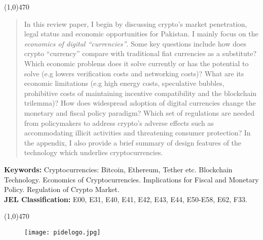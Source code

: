 \documentclass[12pt]{article}
\newcommand{\1}{\mathbbm 1}
\begin{document}
		\begin{center}
			\line(1,0){470}
		\end{center}
		\begin{spacing}{1.1}
			\vspace{-3ex}
			\begin{abstract}
				\noindent 
				In this review paper, I begin by discussing crypto's market penetration, legal status and economic opportunities for Pakistan. I mainly focus on the \textit{economics of digital ``currencies''}. Some key questions include how does crypto ``currency'' compare with traditional fiat currencies as a substitute? Which economic problems does it solve currently or has the potential to solve (e.g lowers verification costs and networking costs)? What are its economic limitations (e.g high energy costs, speculative bubbles, prohibitive costs of maintaining incentive compatibility and the blockchain trilemma)? How does widespread adoption of digital currencies change the monetary and fiscal policy paradigm? Which set of regulations are needed from policymakers to address crypto's adverse effects such as accommodating illicit activities and threatening consumer protection? In the appendix, I also provide a brief summary of design features of the technology which underlies cryptocurrencies.
			\end{abstract}
		\end{spacing}
		\textbf{Keywords:} Cryptocurrencies: Bitcoin, Ethereum, Tether etc. Blockchain Technology. Economics of Cryptocurrencies. Implications for Fiscal and Monetary Policy. Regulation of Crypto Market. {}\\
		\textbf{JEL Classification:} E00, E31, E40, E41, E42, E43, E44, E50-E58, E62, F33.
		\\
		\begin{center}
			\vspace{-8ex}
			\line(1,0){470}
		\end{center}
		\baselineskip=18pt 
		
		\newpage{}
		
		\begin{figure}[H]
			\begin{center}
				\texttt{[image: pidelogo.jpg]}		
				\caption*{}
			\end{center}
		\end{figure}
	
	\vspace{-8ex}
		
\end{document}
